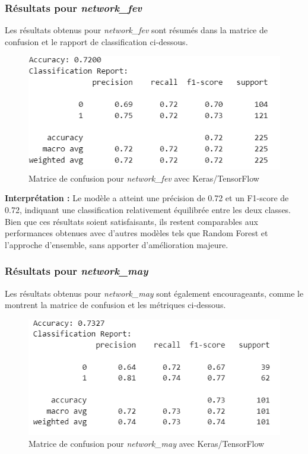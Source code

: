 \subsubsection{Résultats pour \textit{network\_fev}}

Les résultats obtenus pour \textit{network\_fev} sont résumés dans la matrice de confusion et le rapport de classification ci-dessous.

\begin{figure}[H]
    \centering
    \includegraphics[width=0.6\linewidth]{capture_modele_28.png}
    \caption{Matrice de confusion pour \textit{network\_fev} avec Keras/TensorFlow}
\end{figure}

\textbf{Interprétation :} Le modèle a atteint une précision de 0.72 et un F1-score de 0.72, indiquant une classification relativement équilibrée entre les deux classes. Bien que ces résultats soient satisfaisants, ils restent comparables aux performances obtenues avec d'autres modèles tels que Random Forest et l'approche d'ensemble, sans apporter d'amélioration majeure.

\subsubsection{Résultats pour \textit{network\_may}}

Les résultats obtenus pour \textit{network\_may} sont également encourageants, comme le montrent la matrice de confusion et les métriques ci-dessous.

\begin{figure}[H]
    \centering
    \includegraphics[width=0.6\linewidth]{capture_modele_29.png}
    \caption{Matrice de confusion pour \textit{network\_may} avec Keras/TensorFlow}
\end{figure}

